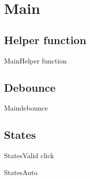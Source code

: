 \documentclass[aspectratio=169,10pt,t]{beamer}
\begin{document}
\section{Main}%
\label{sec:main}

\subsection{Helper function}%
\label{sub:helper_function}


\begin{frame}[t]{Main}{Helper function}
	
\end{frame}

\subsection{Debounce}%
\label{sub:debounce}
\begin{frame}[t]{Main}{debounce}
	
\end{frame}

\subsection{States}%
\label{sub:states}


\begin{frame}[t]{States}{Valid click}
	\only<1>{
	
	}
	\only<2>{
	
	}
\end{frame}

\begin{frame}[t]{States}{Auto}
	
\end{frame}
\end{document}
